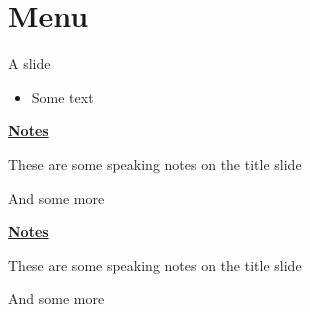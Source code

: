 \documentclass[cabin]{beamer}
\begin{document}
\section{Menu} 
\begin{frame}{A slide}
    \begin{itemize}
        \item Some text         
    \end{itemize}
\end{frame}
\begin{flushleft}
    \underline{\textbf{Notes}}\setlength{\parskip}{.15cm}\notesize\newline\par
    These are some speaking notes on the title slide \par
    And some more 
\end{flushleft}

\begin{frame}[plain]
\end{frame}
\begin{flushleft}
    \underline{\textbf{Notes}}\setlength{\parskip}{.15cm}\notesize\newline\par
    These are some speaking notes on the title slide \par
    And some more 
\end{flushleft}
\end{document}
